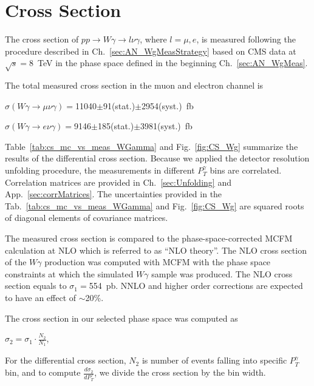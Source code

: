 \section{Cross Section}
\label{sec:AN_CrossSection}

The cross section of $pp\rightarrow W\gamma \rightarrow l\nu\gamma$, where $l=\mu,e$, is measured following the procedure described in Ch.~\ref{sec:AN_WgMeasStrategy} based on CMS data at $\sqrt{s}=$8~TeV in the phase space defined in the beginning Ch.~\ref{sec:AN_WgMeas}. 

The total measured cross section in the muon and electron channel is 

\begin{center}
$\sigma(W\gamma\rightarrow\mu\nu\gamma)=$11040$\pm$91(stat.)$\pm$2954(syst.)~fb

$\sigma(W\gamma\rightarrow e\nu\gamma)=$9146$ \pm $185(stat.)$\pm$3981(syst.)~fb
\end{center}

Table~\ref{tab:cs_mc_vs_meas_WGamma} and Fig.~\ref{fig:CS_Wg} summarize the results of the differential cross section. Because we applied the detector resolution unfolding procedure, the measurements in different $P_T^{\gamma}$ bins are correlated. Correlation matrices are provided in Ch.~\ref{sec:Unfolding} and App.~\ref{sec:corrMatrices}. The uncertainties provided in the Tab.~\ref{tab:cs_mc_vs_meas_WGamma} and Fig.~\ref{fig:CS_Wg} are squared roots of diagonal elements of covariance matrices.

The measured cross section is compared to the phase-space-corrected MCFM calculation at NLO which is referred to as ``NLO theory''. The NLO cross section of the $W\gamma$ production was computed with MCFM with the phase space constraints at which the simulated $W\gamma$ sample was produced. The NLO cross section equals to $\sigma_1=$554~pb. NNLO and higher order corrections are expected to have an effect of $\sim$20\%. 

The cross section in our selected phase space was computed as 
\begin{center}
$\sigma_2 = \sigma_1 \cdot \frac{N_2}{N_1}$, 
\end{center} 

For the differential cross section, $N_2$ is number of events falling into specific $P_T^{\gamma}$ bin, and to compute $\frac{d\sigma_2 }{ dP_T^{\gamma}}$, we divide the cross section by the bin width.

